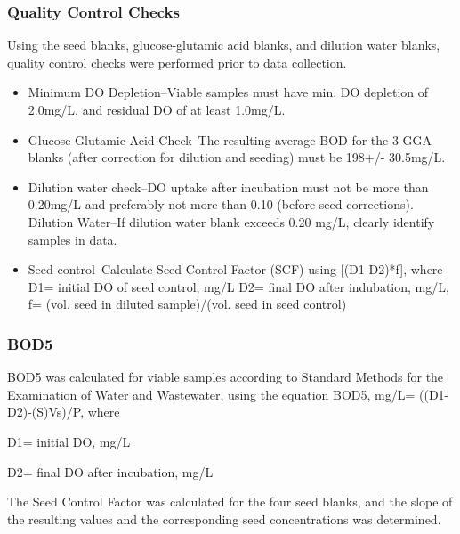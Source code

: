 \documentclass{article}\usepackage[]{graphicx}\usepackage[]{color}
\begin{document}
\subsubsection*{Quality Control Checks}
Using the seed blanks, glucose-glutamic acid blanks, and dilution water blanks, quality control checks were performed prior to data collection. 
\begin{itemize}
  \item Minimum DO Depletion--Viable samples must have min. DO depletion of 2.0mg/L, and residual DO of at least 1.0mg/L.
  \item Glucose-Glutamic Acid Check--The resulting average BOD for the 3 GGA blanks (after correction for dilution and seeding) must be 198+/- 30.5mg/L.
  \item Dilution water check--DO uptake after incubation must not be more than 0.20mg/L and preferably not more than 0.10 (before seed corrections). 
  \subitem Dilution Water--If dilution water blank exceeds 0.20 mg/L, clearly identify samples in data.
  \item Seed control--Calculate Seed Control Factor (SCF) using [(D1-D2)*f], where
  \subitem D1= initial DO of seed control, mg/L
  \subitem D2= final DO after indubation, mg/L,
  \subitem f= (vol. seed in diluted sample)/(vol. seed in seed control)
\end{itemize}

\subsubsection*{BOD5}
BOD5 was calculated for viable samples according to Standard Methods for the Examination of Water and Wastewater, using the equation 
BOD5, mg/L= ((D1-D2)-(S)Vs)/P, where 


D1= initial DO, mg/L

D2= final DO after incubation, mg/L

The Seed Control Factor was calculated for the four seed blanks, and the slope of the resulting values and the corresponding seed concentrations was determined. 
\end{document}
